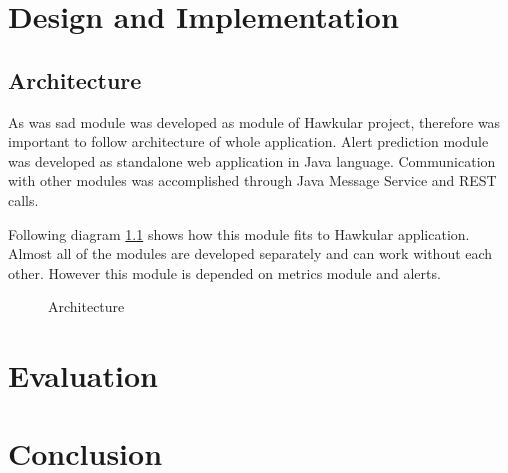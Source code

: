 \chapter{Design and Implementation}
\section{Architecture}
As was sad module was developed as module of Hawkular project, therefore was
important to follow architecture of whole application. Alert prediction module
was developed as standalone web application in Java language. Communication with
other modules was accomplished through Java Message Service and REST calls. 

Following diagram \ref{img_arch} shows how this module fits to Hawkular application.
Almost all of the modules are developed separately and can work without each
other. However this module is depended on metrics module and alerts. 
\begin{figure}[H]
    \begin{center}
        \caption{Architecture}
        \label{img_arch}
    \end{center}
\end{figure}

\chapter{Evaluation}
\chapter{Conclusion}
\cite{rfc_owamp} %

